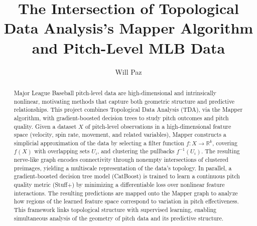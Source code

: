 \documentclass{article}
\begin{document}

\title{The Intersection of Topological Data Analysis’s Mapper Algorithm and Pitch-Level MLB Data} %
\author{Will Paz} %

\maketitle

%
%

\begin{abstract}
Major League Baseball pitch-level data are high-dimensional and intrinsically nonlinear, motivating methods that capture both geometric structure and predictive relationships. This project combines Topological Data Analysis (TDA), via the Mapper algorithm, with gradient-boosted decision trees to study pitch outcomes and pitch quality. Given a dataset $X$ of pitch-level observations in a high-dimensional feature space (velocity, spin rate, movement, and related variables), Mapper constructs a simplicial approximation of the data by selecting a filter function $f : X \to \mathbb{R}^k$, covering $f(X)$ with overlapping sets ${U_i}$, and clustering the pullbacks $f^{-1}(U_i)$. The resulting nerve-like graph encodes connectivity through nonempty intersections of clustered preimages, yielding a multiscale representation of the data’s topology. In parallel, a gradient-boosted decision tree model (CatBoost) is trained to learn a continuous pitch quality metric (Stuff+) by minimizing a differentiable loss over nonlinear feature interactions. The resulting predictions are mapped onto the Mapper graph to analyze how regions of the learned feature space correspond to variation in pitch effectiveness. This framework links topological structure with supervised learning, enabling simultaneous analysis of the geometry of pitch data and its predictive structure.

\end{abstract}
\end{document}
